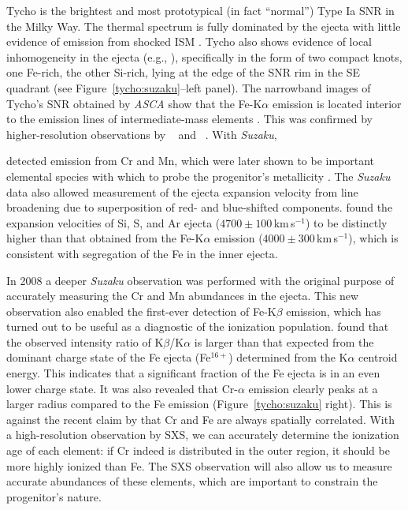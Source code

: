 \documentclass[11pt,a4paper]{article}
\begin{document}
Tycho is the brightest and most prototypical (in fact ``normal'') Type
Ia SNR in the Milky Way.  The thermal spectrum is fully dominated by
the ejecta with little evidence of emission from shocked ISM
\citep{cassamchenai07}.  Tycho also shows evidence of local
inhomogeneity in the ejecta (e.g., \citealt{vancura95}), specifically
in the form of two compact knots, one Fe-rich, the other Si-rich,
lying at the edge of the SNR rim in the SE quadrant (see
Figure~\ref{tycho:suzaku}--left panel).  The narrowband images of
Tycho's SNR obtained by {\it ASCA} show that the Fe-K$\alpha$ emission is
located interior to the emission lines of intermediate-mass elements
\citep{hwang97}.  This was confirmed by higher-resolution observations
by \chandra\ \citep{warren05} and \xmm\ \citep{decourchelle01}.  With
{\it Suzaku}, {\citet{tamagawa09} detected emission from Cr and Mn,
  which were later shown to be important elemental species with which
  to probe the progenitor's metallicity \citep{badenes08b}.  The 
  {\it Suzaku} data also allowed measurement of the ejecta expansion
  velocity from line broadening due to superposition of red- and
  blue-shifted components.  \citet{hayato10} found the expansion
  velocities of Si, S, and Ar ejecta ($4700 \pm 100$\,km\,s$^{-1}$) to
  be distinctly higher than that obtained from the Fe-K$\alpha$
  emission ($4000 \pm 300$\,km\,s$^{-1}$), which is consistent with
  segregation of the Fe in the inner ejecta.


In 2008 a deeper {\it Suzaku} observation was performed with the
original purpose of accurately measuring the Cr and Mn abundances in
the ejecta.  This new observation also enabled the
first-ever detection of Fe-K$\beta$ emission, which has turned out to
be useful as a diagnostic of the ionization population.
\citet{yamaguchi13} found that the observed intensity ratio of
K$\beta$/K$\alpha$ is larger than that expected from the dominant
charge state of the Fe ejecta (Fe$^{16+}$) determined from the
K$\alpha$ centroid energy. This indicates that a significant fraction
of the Fe ejecta is in an even lower charge state.  It was also
revealed that Cr-$\alpha$ emission clearly peaks at a larger radius
compared to the Fe emission (Figure~\ref{tycho:suzaku} right).  This is
against the recent claim by \citet{yang13}  that Cr and Fe
are always spatially correlated. With a high-resolution observation by
SXS, we can accurately determine the ionization age of each element:
if Cr indeed is distributed in the outer region, it should be more
highly ionized than Fe. The SXS observation will also allow us to
measure accurate abundances of these elements, which are important to
constrain the progenitor's nature.

}
\end{document}

